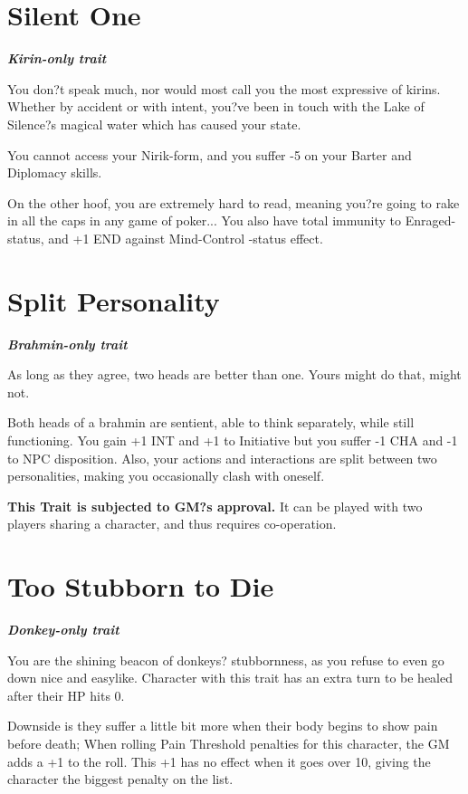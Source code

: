 \documentclass[11pt,a4paper,twocolumn]{book}
\begin{document}
	\section*{Silent One}
	\emph{\textbf{Kirin-only trait}}
	
	You don?t speak much, nor would most call you the most expressive of kirins. Whether by accident or with intent, you?ve been in touch with the Lake of Silence?s magical water which has caused your state.
	
	You cannot access your Nirik-form, and you suffer -5 on your Barter and Diplomacy skills.
	
	On the other hoof, you are extremely hard to read, meaning you?re going to rake in all the caps in any game of poker... You also have total immunity to Enraged-status, and +1 END against Mind-Control -status effect.
	
	\section*{Split Personality}
	\emph{\textbf{Brahmin-only trait}}
	
	As long as they agree, two heads are better than one. Yours might do that, might not. 
	
	Both heads of a brahmin are sentient, able to think separately, while still functioning. You gain +1 INT and +1 to Initiative but you suffer -1 CHA and -1 to NPC disposition. Also, your actions and interactions are split between two personalities, making you occasionally clash with oneself.
	
	\textbf{This Trait is subjected to GM?s approval.} It can be played with two players sharing a character, and thus requires co-operation.
	
	\section*{Too Stubborn to Die}
	\emph{\textbf{Donkey-only trait}}
	
	You are the shining beacon of donkeys? stubbornness, as you refuse to even go down nice and easylike. Character with this trait has an extra turn to be healed after their HP hits 0. 
	
	Downside is they suffer a little bit more when their body begins to show pain before death; When rolling Pain Threshold penalties for this character, the GM adds a +1 to the roll. This +1 has no effect when it goes over 10, giving the character the biggest penalty on the list.
	
\end{document}
